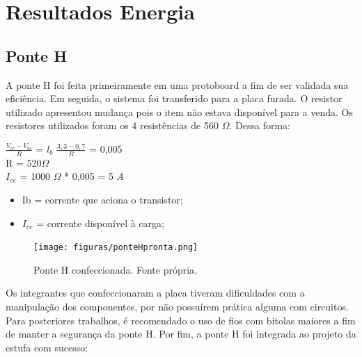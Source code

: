 \section{Resultados Energia}

\subsection{Ponte H}

A ponte H foi feita primeiramente em uma protoboard a fim de ser validada sua eficiência. Em seguida, o sistema foi transferido para a placa furada. O resistor utilizado apresentou mudança pois o item não estava disponível para a venda. Os resistores utilizados foram os 4 resistências de 560 $\Omega$. Dessa forma:  

\begin{center}
	$\frac{V_{cc} - V_{be}}{R}$ = $l_{b}$
	$\frac{3,3 - 0,7}{R}$ = 0,005\\
	R = 520$\Omega$\\
	$I_{ce}$ = 1000 $\Omega$ * 0,005 = 5 \textit{A}
\end{center}

\begin{itemize}
	\item Ib = corrente que aciona o transistor;
	\item $I_{ce}$ = corrente disponível à carga;
\end{itemize}

\begin{figure}[H]
	\centering
	\texttt{[image: figuras/ponteHpronta.png]}
	\caption{Ponte H confeccionada. Fonte própria.}
	\label{ponteHpronta}
\end{figure}

Os integrantes que confeccionaram a placa tiveram dificuldades com a manipulação dos componentes, por não possuírem prática alguma com circuitos. Para posteriores trabalhos, é recomendado o uso de fios com bitolas maiores a fim de manter a segurança da ponte H.
Por fim, a ponte H foi integrada ao projeto da estufa com sucesso:

